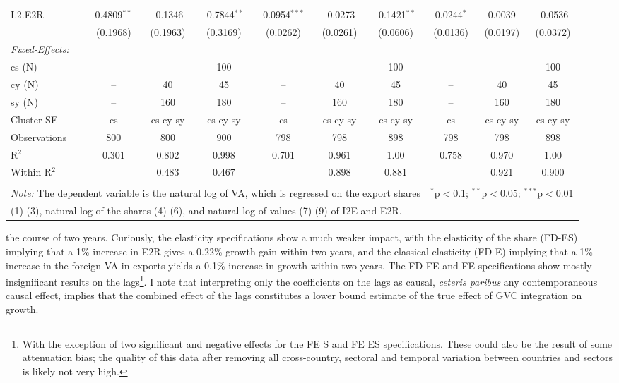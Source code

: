 \documentclass[a4paper]{article}
\begin{document}
\begin{table}[h!]
{\begin{tabular}[t]{lccccccccc}
L2.E2R&0.4809$^{**}$ & -0.1346 & -0.7844$^{**}$ & 0.0954$^{***}$ & -0.0273 & -0.1421$^{**}$ & 0.0244$^{*}$ & 0.0039 & -0.0536\\
  &(0.1968) & (0.1963) & (0.3169) & (0.0262) & (0.0261) & (0.0606) & (0.0136) & (0.0197) & (0.0372)\\%
\midrule \emph{Fixed-Effects:} &   &   &   &   &   &  \\
cs (N) & -- & -- & 100 & -- & -- & 100 & -- & -- & 100\\
cy (N) & -- & 40 & 45 & -- & 40 & 45 & -- & 40 & 45\\
sy (N) & -- & 160 & 180 & -- & 160 & 180 & -- & 160 & 180\\
\midrule
Cluster SE & cs & cs cy sy & cs cy sy & cs & cs cy sy & cs cy sy & cs & cs cy sy & cs cy sy\\
Observations & 800&800&900&798&798&898&798&798&898\\
R$^2$ & 0.301&0.802&0.998&0.701&0.961&1.00&0.758&0.970&1.00\\
Within R$^2$ & &0.483&0.467&&0.898&0.881&&0.921&0.900\\ \bottomrule \\[-1em]
\multicolumn{7}{l}{\small \textit{Note:} The dependent variable is the natural log of VA, which is regressed on the  export shares}   & \multicolumn{3}{r}{$^{*}$p$<$0.1; $^{**}$p$<$0.05; $^{***}$p$<$0.01} \\ [-0.2em]
\multicolumn{10}{l}{\small \quad \quad \quad (1)-(3), natural log of the shares (4)-(6), and natural log of values (7)-(9) of I2E and E2R.} \\
\end{tabular}
}
\end{table}
\FloatBarrier



\noindent the course of two years. Curiously, the elasticity specifications show a much weaker impact, with the elasticity of the share (FD-ES) implying that a 1\% increase in E2R gives a 0.22\% growth gain within two years, and the classical elasticity (FD E) implying that a 1\% increase in the foreign VA in exports yields a 0.1\% increase in growth within two years. The FD-FE and FE specifications show mostly insignificant results on the lags\footnote{With the exception of two significant and negative effects for the FE S and FE ES specifications. These could also be the result of some attenuation bias; the quality of this data after removing all cross-country, sectoral and temporal variation between countries and sectors is likely not very high.}.  I note that interpreting only the coefficients on the lags as causal, \textit{ceteris paribus} any contemporaneous causal effect, implies that the combined effect of the lags constitutes a lower bound estimate of the true effect of GVC integration on growth.  \newline
\end{document}
